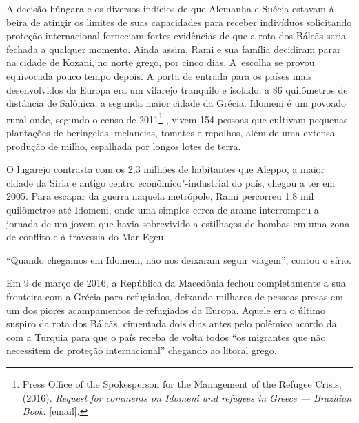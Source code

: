 A decisão húngara e os diversos indícios de que Alemanha e Suécia
estavam à beira de atingir os limites de suas capacidades para receber
indivíduos solicitando proteção internacional forneciam fortes
evidências de que a rota dos Bálcãs seria fechada a qualquer momento.
Ainda assim, Rami e sua família decidiram parar na cidade de Kozani, no
norte grego, por cinco dias. A~escolha se provou equivocada pouco
tempo depois.
% 
% 
% 
A porta de entrada para os países mais desenvolvidos da Europa era um
vilarejo tranquilo e isolado, a 86 quilômetros de distância de Salônica,
a segunda maior cidade da Grécia. Idomeni é um povoado rural onde,
segundo o censo de 2011\footnote{ Press Office of the Spokesperson for the Management
of the Refugee Crisis, (2016). \emph{Request for comments on Idomeni and
refugees in Greece --- Brazilian Book}. {[}email{]}.} , vivem 154 pessoas que
cultivam pequenas plantações de beringelas, melancias, tomates e
repolhos, além de uma extensa produção de milho, espalhada por longos
lotes de terra.

O lugarejo contrasta com os 2,3 milhões de habitantes que Aleppo, a
maior cidade da Síria e antigo centro econômico"-industrial do país,
chegou a ter em 2005. Para escapar da guerra naquela metrópole, Rami
percorreu 1,8 mil quilômetros até Idomeni, onde uma simples cerca de
arame interrompeu a jornada de um jovem que havia sobrevivido a
estilhaços de bombas em uma zona de conflito e à travessia do Mar Egeu.

``Quando chegamos em Idomeni, não nos deixaram seguir viagem'', contou
o sírio.

 Em 9 de março de 2016, a República da Macedônia fechou completamente a sua
fronteira com a Grécia para refugiados, deixando milhares de
pessoas presas em um dos piores acampamentos de refugiados da Europa.
Aquele era o último suspiro da rota dos Bálcãs, cimentada dois dias
antes pelo polêmico acordo da  com a Turquia para que o país receba de volta todos ``os migrantes que não necessitem de proteção
internacional'' chegando ao litoral grego.
% 
% 
% 
%
%

